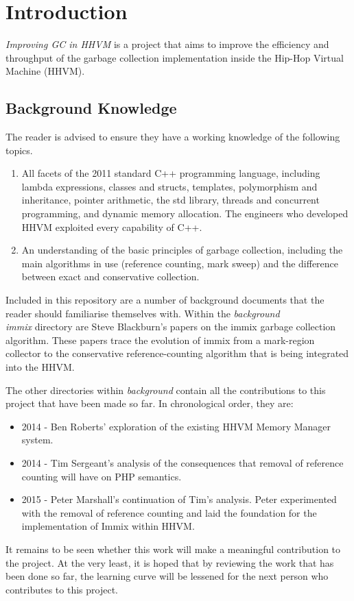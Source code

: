 

\chapter{Introduction}
\emph{Improving GC in HHVM} is a project that aims to improve the efficiency and throughput of the garbage collection implementation inside the Hip-Hop Virtual Machine (HHVM).


\section{Background Knowledge}
The reader is advised to ensure they have a working knowledge of the following topics.
\begin{enumerate}
  \item All facets of the 2011 standard C++ programming language, including lambda expressions, classes and structs, templates, polymorphism and inheritance, pointer arithmetic, the std library, threads and concurrent programming, and dynamic memory allocation. The engineers who developed HHVM exploited every capability of C++.
  \item An understanding of the basic principles of garbage collection, including the main algorithms in use (reference counting, mark sweep) and the difference between exact and conservative collection.
\end{enumerate}
Included in this repository are a number of background documents that the reader should familiarise themselves with. Within the \emph{background\\immix} directory are Steve Blackburn's papers on the immix garbage collection algorithm. These papers trace the evolution of immix from a mark-region collector to the conservative reference-counting algorithm that is being integrated into the HHVM.

The other directories within \emph{background} contain all the contributions to this project that have been made so far. In chronological order, they are:
\begin{itemize}
  \item 2014 - Ben Roberts' exploration of the existing HHVM Memory Manager system.
  \item 2014 - Tim Sergeant's analysis of the consequences that removal of reference counting will have on PHP semantics.
  \item 2015 - Peter Marshall's continuation of Tim's analysis. Peter experimented with the removal of reference counting and laid the foundation for the implementation of Immix within HHVM.
\end{itemize}
It remains to be seen whether this work will make a meaningful contribution to the project. At the very least, it is hoped that by reviewing the work that has been done so far, the learning curve will be lessened for the next person who contributes to this project.

